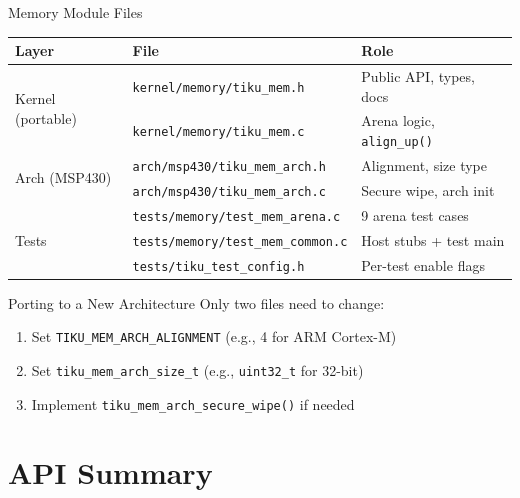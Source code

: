 \documentclass[aspectratio=169, 10pt]{beamer}
\begin{document}
\begin{frame}[fragile]{Memory Module Files}
\begin{table}
\centering
\small
\begin{tabular}{@{}lll@{}}
\toprule
\textbf{Layer} & \textbf{File} & \textbf{Role} \\
\midrule
\multirow{2}{*}{Kernel (portable)}
  & \texttt{kernel/memory/tiku\_mem.h} & Public API, types, docs \\
  & \texttt{kernel/memory/tiku\_mem.c} & Arena logic, \texttt{align\_up()} \\
\midrule
\multirow{2}{*}{Arch (MSP430)}
  & \texttt{arch/msp430/tiku\_mem\_arch.h} & Alignment, size type \\
  & \texttt{arch/msp430/tiku\_mem\_arch.c} & Secure wipe, arch init \\
\midrule
\multirow{3}{*}{Tests}
  & \texttt{tests/memory/test\_mem\_arena.c} & 9 arena test cases \\
  & \texttt{tests/memory/test\_mem\_common.c} & Host stubs + test main \\
  & \texttt{tests/tiku\_test\_config.h} & Per-test enable flags \\
\bottomrule
\end{tabular}
\end{table}

\vspace{0.5em}
\begin{block}{Porting to a New Architecture}
Only two files need to change:
\begin{enumerate}
  \item Set \texttt{TIKU\_MEM\_ARCH\_ALIGNMENT} (e.g., 4 for ARM Cortex-M)
  \item Set \texttt{tiku\_mem\_arch\_size\_t} (e.g., \texttt{uint32\_t} for 32-bit)
  \item Implement \texttt{tiku\_mem\_arch\_secure\_wipe()} if needed
\end{enumerate}
\end{block}
\end{frame}

\section{API Summary}
\end{document}
